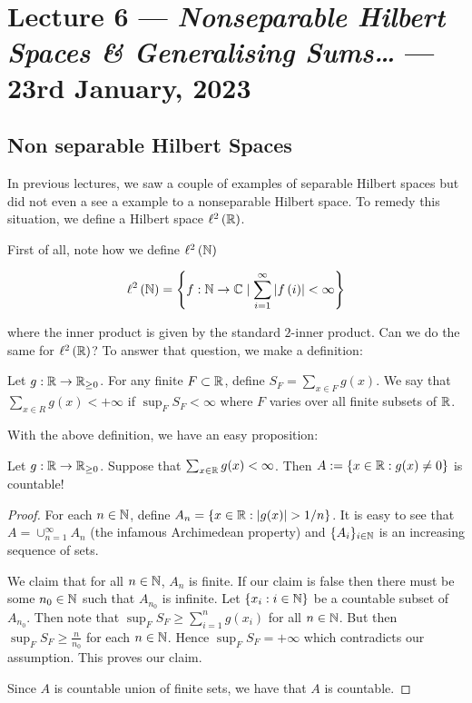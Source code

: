 \section{Lecture 6 --- \textit{Nonseparable Hilbert Spaces \& Generalising Sums\ldots} --- 23rd January, 2023}
 
\subsection{Non separable Hilbert Spaces}

In previous lectures, we saw a couple of examples of separable Hilbert spaces but did not even a see a example to a nonseparable Hilbert space. To remedy this situation, we define a Hilbert space $\ell ^{2} \left( \mathbb R \right)$.

First of all, note how we define $\ell ^{2} \left( \mathbb N \right)$

\begin{equation*}
    \ell ^{2} \left( \mathbb N \right)  = \left\{ f : \mathbb N \to \mathbb C \mid \sum_{i=1}^{\infty} \left\lvert f \left( i \right) \right\rvert < \infty \right\}
\end{equation*}

where the inner product is given by the standard $2$-inner product. Can we do the same for $\ell ^{2} \left( \mathbb R \right)$? To answer that question, we make a definition:

\begin{definition}
    Let $g: \mathbb R \to \mathbb R _{\ge 0}$. For any finite $F \subset \mathbb R$, define $S_{F} = \sum_{x\in F} g\left( x \right)$.  We say that $\sum_{x\in R} g(x) < +\infty$ if $\sup_{F} S_{F} < \infty$ where $F$ varies over all finite subsets of $\mathbb R$. 

\end{definition}

With the above definition, we have an easy proposition:


\begin{proposition}
    Let $g: \mathbb R \to \mathbb R_{\ge 0}$. Suppose that $\sum_{x\in \mathbb R} g(x) < \infty$. Then $A:=\left\{ x \in \mathbb R : g(x)\ne 0 \right\}$ is countable!
 \end{proposition}

 \begin{proof}
     For each $n\in \mathbb N$, define $A_{n} = \left\{ x \in \mathbb R : \left\lvert g(x) \right\rvert >1/n \right\}$.
     It is easy to see that $A=\cup_{n=1}^{\infty} A_{n}$ (the infamous Archimedean property) and $\{ A_{i} \}_{i \in \mathbb N}$ is an increasing sequence of sets.

     We claim that for all $n\in \mathbb N$, $A_{n}$ is finite. If our claim is false then there must be some $n_{0} \in \mathbb N$ such that $A_{n_{0}}$ is infinite. Let $\left\{ x_{i} : i \in \mathbb N \right\}$ be a countable subset of $A_{n_{0}}$. Then note that $\sup_{F} S_{F} \ge \sum_{i=1}^{n} g(x_{i})$ for all $n\in \mathbb N$. But then $\sup_{F} S_{F} \ge \frac{n}{n_{0}}$ for each $n\in \mathbb N$. Hence $\sup_{F} S_{F} = +\infty$ which contradicts our assumption. This proves our claim.

     Since $A$ is countable union of finite sets, we have that $A$ is countable.
 \end{proof}

